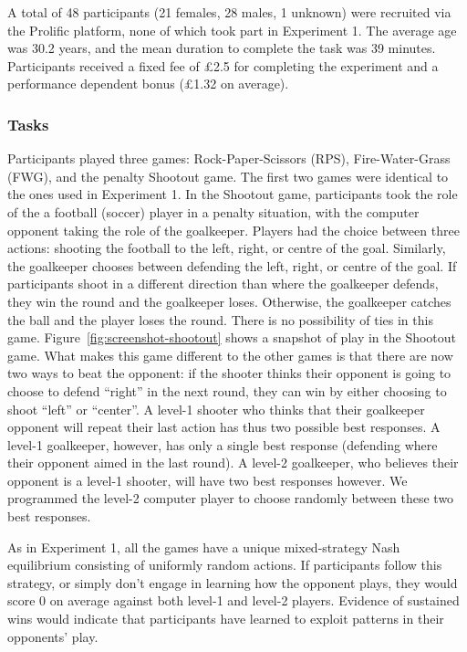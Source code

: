 \documentclass[english,man,floatsintext]{apa6}
\begin{document}
A total of 48 participants (21 females, 28 males, 1 unknown) were recruited via the Prolific platform, none of which took part in Experiment 1. The average age was 30.2 years, and the mean duration to complete the task was 39 minutes. Participants received a fixed fee of £2.5 for completing the experiment and a performance dependent bonus (£1.32 on average).

\hypertarget{tasks-1}{%
\subsubsection{Tasks}\label{tasks-1}}

Participants played three games: Rock-Paper-Scissors (RPS), Fire-Water-Grass (FWG), and the penalty Shootout game. The first two games were identical to the ones used in Experiment 1. In the Shootout game, participants took the role of the a football (soccer) player in a penalty situation, with the computer opponent taking the role of the goalkeeper. Players had the choice between three actions: shooting the football to the left, right, or centre of the goal. Similarly, the goalkeeper chooses between defending the left, right, or centre of the goal. If participants shoot in a different direction than where the goalkeeper defends, they win the round and the goalkeeper loses. Otherwise, the goalkeeper catches the ball and the player loses the round. There is no possibility of ties in this game. Figure~\ref{fig:screenshot-shootout} shows a snapshot of play in the Shootout game. What makes this game different to the other games is that there are now two ways to beat the opponent: if the shooter thinks their opponent is going to choose to defend \enquote{right} in the next round, they can win by either choosing to shoot \enquote{left} or \enquote{center}. A level-1 shooter who thinks that their goalkeeper opponent will repeat their last action has thus two possible best responses. A level-1 goalkeeper, however, has only a single best response (defending where their opponent aimed in the last round). A level-2 goalkeeper, who believes their opponent is a level-1 shooter, will have two best responses however. We programmed the level-2 computer player to choose randomly between these two best responses.

As in Experiment 1, all the games have a unique mixed-strategy Nash equilibrium consisting of uniformly random actions. If participants follow this strategy, or simply don't engage in learning how the opponent plays, they would score 0 on average against both level-1 and level-2 players. Evidence of sustained wins would indicate that participants have learned to exploit patterns in their opponents' play.
\end{document}
